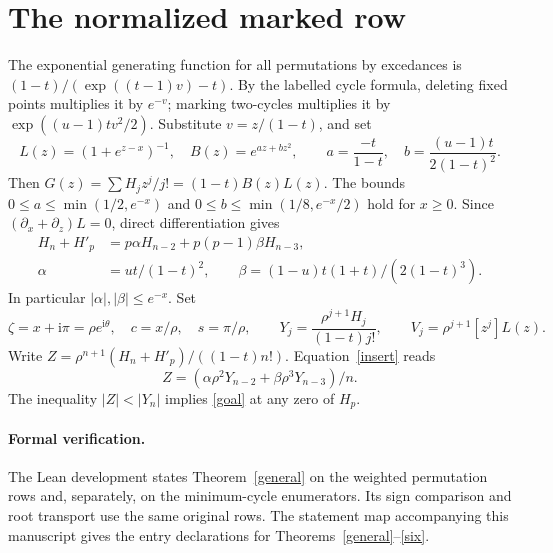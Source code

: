\documentclass[11pt]{article}
\newcommand{\ii}{\mathrm{i}}
\begin{document}
\section{The normalized marked row}\label{sec:normalized}
The exponential generating function for all permutations by excedances is \((1-t)/(\exp((t-1)v)-t)\). By the labelled cycle formula, deleting fixed points multiplies it by \(e^{-v}\); marking two-cycles multiplies it by \(\exp((u-1)tv^2/2)\). Substitute \(v=z/(1-t)\), and set
\[
 L(z)=(1+e^{z-x})^{-1},\quad B(z)=e^{az+bz^2},\qquad
 a=\frac{-t}{1-t},\quad b=\frac{(u-1)t}{2(1-t)^2}.
\]
Then \(G(z)=\sum H_j z^j/j!=(1-t)B(z)L(z)\).
The bounds \(0\le a\le\min(1/2,e^{-x})\) and \(0\le b\le\min(1/8,e^{-x}/2)\) hold for \(x\ge0\). Since \((\partial_x+\partial_z)L=0\), direct differentiation gives
\begin{align}
 H_n+H'_p&=p\alpha H_{n-2}+p(p-1)\beta H_{n-3},\label{insert}\\
 \alpha&=ut/(1-t)^2,\qquad \beta=(1-u)t(1+t)/(2(1-t)^3).\nonumber
\end{align}
In particular \(|\alpha|,|\beta|\le e^{-x}\). Set
\[
 \zeta=x+\ii\pi=\rho e^{\ii\theta},\quad c=x/\rho,\quad s=\pi/\rho,\qquad
 Y_j=\frac{\rho^{j+1}H_j}{(1-t)j!},\qquad V_j=\rho^{j+1}[z^j]L(z).
\]
Write \(Z=\rho^{n+1}(H_n+H'_p)/((1-t)n!)\). Equation~\eqref{insert} reads
\[
 Z=(\alpha\rho^2Y_{n-2}+\beta\rho^3Y_{n-3})/n .
\]
The inequality \(|Z|<|Y_n|\) implies \eqref{goal} at any zero of \(H_p\).






\paragraph{Formal verification.}
The Lean development states Theorem~\ref{general} on the weighted permutation rows and, separately, on the minimum-cycle enumerators. Its sign comparison and root transport use the same original rows. The statement map accompanying this manuscript gives the entry declarations for Theorems~\ref{general}--\ref{six}.
\end{document}
